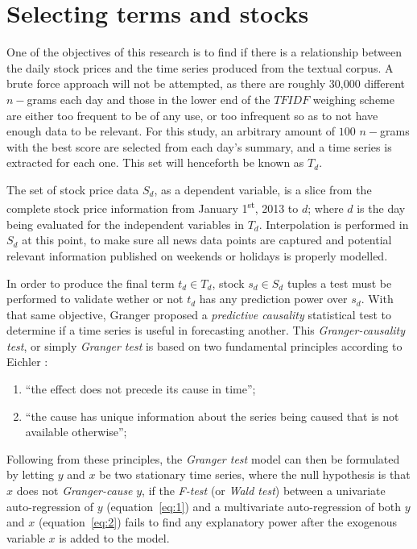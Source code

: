 \documentclass[conference,11pt]{IEEEtran}
\begin{document}
\section{Selecting terms and stocks}
One of the objectives of this research is to find if there is a relationship between the daily stock prices and the time series produced from the textual corpus. A brute force approach will not be attempted, as there are roughly 30,000 different \(n-\)grams each day and those in the lower end of the \(TFIDF\) weighing scheme are either too frequent to be of any use, or too infrequent so as to not have enough data to be relevant. For this study, an arbitrary amount of \(100\) \(n-\)grams with the best score are selected from each day's summary, and a time series is extracted for each one. This set will henceforth be known as \(T_d\).

\par
The set of stock price data \(S_d\), as a dependent variable, is a slice from the complete stock price information from January 1\textsuperscript{st}, 2013 to \(d\); where \(d\) is the day being evaluated for the independent variables in \(T_d\). Interpolation is performed in \(S_d\) at this point, to make sure all news data points are captured and potential relevant information published on weekends or holidays is properly modelled.

\par
In order to produce the final term \(t_d \in T_d\), stock \(s_d \in S_d\) tuples a test must be performed to validate wether or not \(t_d\) has any prediction power over \(s_d\). With that same objective, Granger \citep{Granger1969,Granger1980} proposed a \textit{predictive causality} statistical test to determine if a time series is useful in forecasting another. This \textit{Granger-causality test}, or simply \textit{Granger test} is based on two fundamental principles according to Eichler \citep{eichler2012}:

\begin{enumerate}
\item ``the effect does not precede its cause in time'';
\item ``the cause has unique information about the series being caused that is not available otherwise'';
\end{enumerate}

\par
Following from these principles, the \textit{Granger test} model can then be formulated by letting \(y\) and \(x\) be two stationary time series, where the null hypothesis is that \(x\) does not \textit{Granger-cause} \(y\), if the \textit{F-test} (or \textit{Wald test}) between a univariate auto-regression of \(y\) (equation~\ref{eq:1}) and a multivariate auto-regression of both \(y\) and \(x\) (equation~\ref{eq:2}) fails to find any explanatory power after the exogenous variable \(x\) is added to the model.
\end{document}
